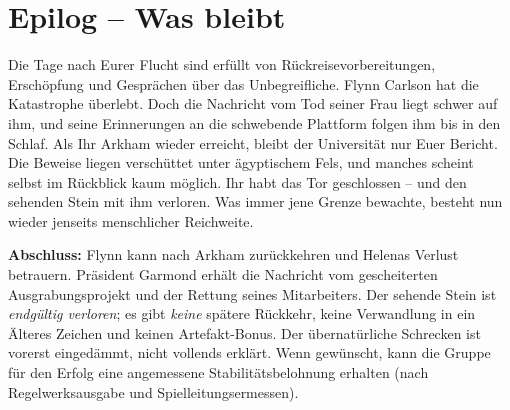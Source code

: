 \chapter*{Epilog -- Was bleibt}
\begin{vorlesetextalle}
Die Tage nach Eurer Flucht sind erfüllt von Rückreisevorbereitungen, Erschöpfung und Gesprächen über das Unbegreifliche. Flynn Carlson hat die Katastrophe überlebt. Doch die Nachricht vom Tod seiner Frau liegt schwer auf ihm, und seine Erinnerungen an die schwebende Plattform folgen ihm bis in den Schlaf. Als Ihr Arkham wieder erreicht, bleibt der Universität nur Euer Bericht. Die Beweise liegen verschüttet unter ägyptischem Fels, und manches scheint selbst im Rückblick kaum möglich. Ihr habt das Tor geschlossen -- und den sehenden Stein mit ihm verloren. Was immer jene Grenze bewachte, besteht nun wieder jenseits menschlicher Reichweite.
\end{vorlesetextalle}
\begin{meisterinfo}
\textbf{Abschluss:} Flynn kann nach Arkham zurückkehren und Helenas Verlust betrauern. Präsident Garmond erhält die Nachricht vom gescheiterten Ausgrabungsprojekt und der Rettung seines Mitarbeiters. Der sehende Stein ist \emph{endgültig verloren}; es gibt \emph{keine} spätere Rückkehr, keine Verwandlung in ein Älteres Zeichen und keinen Artefakt-Bonus. Der übernatürliche Schrecken ist vorerst eingedämmt, nicht vollends erklärt. Wenn gewünscht, kann die Gruppe für den Erfolg eine angemessene Stabilitätsbelohnung erhalten (nach Regelwerksausgabe und Spielleitungsermessen).
\end{meisterinfo}
